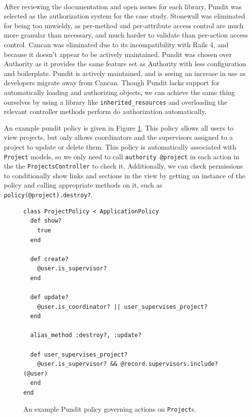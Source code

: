 \par \noindent \\ After reviewing the documentation and open issues for each library, Pundit was selected as the authorization system for the case study. Stonewall was eliminated for being too unwieldy, as per-method and per-attribute access control are much more granular than necessary, and much harder to validate than per-action access control. Cancan was eliminated due to its incompatibility with Rails 4, and because it doesn’t appear to be actively maintained. Pundit was chosen over Authority as it provides the same feature set as Authority with less configuration and boilerplate. Pundit is actively maintained, and is seeing an increase in use as developers migrate away from Cancan. Though Pundit lacks support for automatically loading and authorizing objects, we can achieve the same thing ourselves by using a library like \verb!inherited_resources! and overloading the relevant controller methods perform do authorization automatically.

An example pundit policy is given in Figure \ref{fig:4ys-pundit-policy}. This policy allows all users to view projects, but only allows coordinators and the supervisors assigned to a project to update or delete them. This policy is automatically associated with \verb!Project! models, so we only need to call
\verb!authority @project! in each action in the the \verb!ProjectsController! to check it. Additionally, we can check permissions to conditionally show links and sections in the view by getting an instance of the policy and calling appropriate methods on it, such as \verb!policy(@project).destroy?!.

\begin{figure}[!ht]
  \begin{lstlisting}
class ProjectPolicy < ApplicationPolicy
  def show?
    true
  end

  def create?
    @user.is_supervisor?
  end

  def update?
    @user.is_coordinator? || user_supervises_project?
  end

  alias_method :destroy?, :update?

  def user_supervises_project?
    @user.is_supervisor? && @record.supervisors.include?(@user)
  end
end
  \end{lstlisting}
  \cprotect \caption{An example Pundit policy governing actions on \verb!Project!s.}
  \label{fig:4ys-pundit-policy}
\end{figure}


